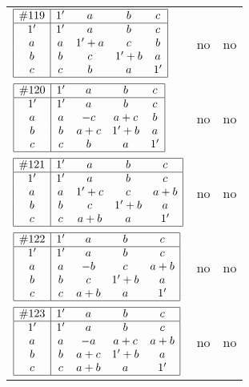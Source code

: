 \documentclass[12pt]{article}
\newcommand{\join}{\mathbin{+}}%
\newcommand{\id}{{1'}}%
\begin{document}
\begin{center}
\begin{longtable}{l|c|c}
$
\begin{array}{|c|cccc|} \hline
\#119 & \id & a & b & c \\ \hline
\id & \id & a & b & c \\
a & a & \id \join a & c & b \\
b & b & c & \id \join b & a \\
c & c & b & a & \id \\ \hline
\end{array}
$
 & no  
 & no      \\[15mm]

$
\begin{array}{|c|cccc|} \hline
\#120 & \id & a & b & c \\ \hline
\id & \id & a & b & c \\
a & a & -c & a \join c & b \\
b & b & a \join c & \id \join b & a \\
c & c & b & a & \id \\ \hline
\end{array}
$
 & no  
 & no      \\[15mm]

$
\begin{array}{|c|cccc|} \hline
\#121 & \id & a & b & c \\ \hline
\id & \id & a & b & c \\
a & a & \id \join c & c & a \join b \\
b & b & c & \id \join b & a \\
c & c & a \join b & a & \id \\ \hline
\end{array}
$
 & no  
 & no      \\[15mm]

$
\begin{array}{|c|cccc|} \hline
\#122 & \id & a & b & c \\ \hline
\id & \id & a & b & c \\
a & a & -b & c & a \join b \\
b & b & c & \id \join b & a \\
c & c & a \join b & a & \id \\ \hline
\end{array}
$
 & no  
 & no      \\[15mm]

$
\begin{array}{|c|cccc|} \hline
\#123 & \id & a & b & c \\ \hline
\id & \id & a & b & c \\
a & a & -a & a \join c & a \join b \\
b & b & a \join c & \id \join b & a \\
c & c & a \join b & a & \id \\ \hline
\end{array}
$
 & no  
 & no       \\[15mm]


\end{longtable}
\end{center}
\end{document}
